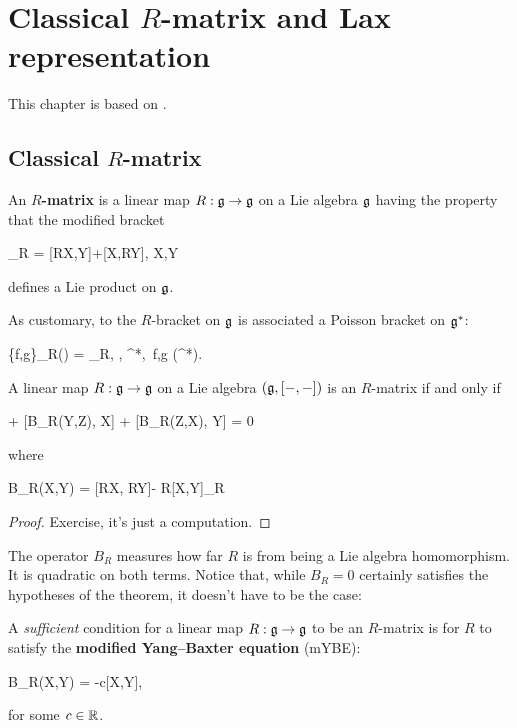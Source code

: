 \documentclass[main.tex]{subfiles}
\begin{document}
\chapter{Classical $R$-matrix and Lax representation}
This chapter is based on \cite[Section 3]{oevel1989r}.

\section[Classical R-matrix]{Classical $R$-matrix}
\begin{definition}
	An \textbf{$R$-matrix} is a linear map $R: \mathfrak g \to \mathfrak g$ on a Lie algebra $\mathfrak g$ having the property that the modified bracket
	\begin{eqalign}
		[X,Y]_R = [RX,Y]+[X,RY], \quad \forall X,Y \in \lalg
	\end{eqalign}
	defines a Lie product on $\mathfrak g$.
\end{definition}

As customary, to the $R$-bracket on $\mathfrak g$ is associated a Poisson bracket on $\mathfrak g^*$:
\begin{eqalign}
	\{f,g\}_R(\xi) = \langle [df, dg]_R, \xi \rangle, \quad \forall \xi \in \lalg^*,\, \forall f,g \in \Cinfty(\lalg^*).
\end{eqalign}

\begin{proposition}
	A linear map $R: \mathfrak g \to \mathfrak g$ on a Lie algebra $(\mathfrak g, [-,-])$ is an $R$-matrix if and only if
	\begin{eqalign}
		[B_R(X,Y), Z] + [B_R(Y,Z), X] + [B_R(Z,X), Y] = 0
	\end{eqalign}
	where
	\begin{eqalign}
		B_R(X,Y) = [RX, RY]- R[X,Y]_R
	\end{eqalign}
\end{proposition}
\begin{proof}
	Exercise, it's just a computation.
\end{proof}

The operator $B_R$ measures how far $R$ is from being a Lie algebra homomorphism. It is quadratic on both terms. Notice that, while $B_R = 0$ certainly satisfies the hypotheses of the theorem, it doesn't have to be the case:

\begin{corollary}
	A \emph{sufficient} condition for a linear map $R: \mathfrak g \to \mathfrak g$ to be an $R$-matrix is for $R$ to satisfy the \textbf{modified Yang--Baxter equation} (mYBE):
	\begin{eqalign}
		B_R(X,Y) = -c[X,Y],
	\end{eqalign}
	for some $c \in \mathbb{R}$.
\end{corollary}
\end{document}
